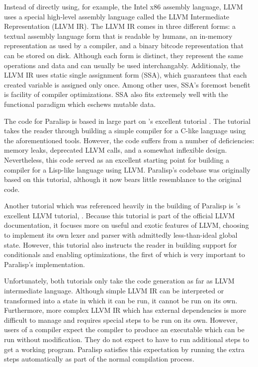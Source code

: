 \documentclass[abstracton]{scrartcl}
\begin{document}
Instead of directly using, for example, the Intel x86 assembly language, LLVM uses a special high-level assembly language called the LLVM Intermediate Representation (LLVM IR). The LLVM IR comes in three different forms: a textual assembly language form that is readable by humans, an in-memory representation as used by a compiler, and a binary bitcode representation that can be stored on disk. Although each form is distinct, they represent the same operations and data and can usually be used interchangably. Additionaly, the LLVM IR uses static single assignment form (SSA), which guarantees that each created variable is assigned only once. Among other uses, SSA's foremost benefit is facility of compiler optimizations. SSA also fits extremely well with the functional paradigm which eschews mutable data.

The code for Paralisp is based in large part on \citeauthor{toy-compiler}'s excellent tutorial  \autocite{toy-compiler}. The tutorial takes the reader through building a simple compiler for a C-like language using the aforementioned tools. However, the code suffers from a number of deficiencies: memory leaks, deprecated LLVM calls, and a somewhat inflexible design. Nevertheless, this code served as an excellent starting point for building a compiler for a Lisp-like language using LLVM\@. Paralisp's codebase was originally based on this tutorial, although it now bears little resemblance to the original code.

Another tutorial which was referenced heavily in the building of Paralisp is \citeauthor{llvm-kaleidescope}'s excellent LLVM tutorial,  \autocite{llvm-kaleidescope}. Because this tutorial is part of the official LLVM documentation, it focuses more on useful and exotic features of LLVM, choosing to implement its own lexer and parser with admittedly less-than-ideal global state. However, this tutorial also instructs the reader in building support for conditionals and enabling optimizations, the first of which is very important to Paralisp's implementation.

Unfortunately, both tutorials only take the code generation as far as LLVM intermediate language. Although simple LLVM IR can be interpreted or transformed into a state in which it can be run, it cannot be run on its own. Furthermore, more complex LLVM IR which has external dependencies is more difficult to manage and requires special steps to be run on its own. However, users of a compiler expect the compiler to produce an executable which can be run without modification. They do not expect to have to run additional steps to get a working program. Paralisp satisfies this expectation by running the extra steps automatically as part of the normal compilation process.
\end{document}
